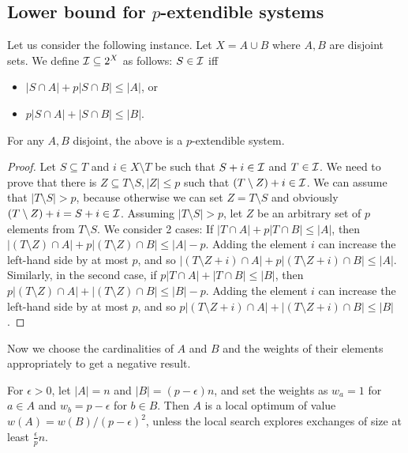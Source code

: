 \subsection{Lower bound for $p$-extendible systems}

Let us consider the following instance. Let $X = A \cup B$ where $A, B$ are disjoint sets. We define $\mathcal{I} \subseteq 2^X$ as follows: $S \in \mathcal{I}$ iff
\begin{itemize}
\item $|S \cap A| + p |S \cap B| \leq |A|$, or
\item $p|S \cap A| + |S \cap B| \leq |B|$.
\end{itemize}

\begin{lemma}
For any $A,B$ disjoint, the above is a $p$-extendible system.
\end{lemma}

\begin{proof}
Let $S \subseteq T$ and $i \in X \setminus T$ be such that $S+i \in \mathcal{I}$ and $T \in \mathcal{I}$. We need to prove that there is $Z \subseteq T \setminus S, |Z| \leq p$ such that $(T \setminus Z) + i \in \mathcal{I}$. We can assume that $|T \setminus S| > p$, because otherwise we can set $Z = T \setminus S$ and obviously $(T \setminus Z) + i = S + i \in \mathcal{I}$.
Assuming $|T \setminus S| > p$, let $Z$ be an arbitrary set of $p$ elements from $T \setminus S$. We consider 2 cases: If $|T \cap A| + p |T \cap B| \leq |A|$, then $|(T \setminus Z) \cap A| + p |(T \setminus Z) \cap B| \leq |A| - p$. Adding the element $i$ can increase the left-hand side by at most $p$, and so $|(T \setminus Z + i) \cap A| + p |(T \setminus Z + i) \cap B| \leq |A|$. Similarly, in the second case, if $p |T \cap A| + |T \cap B| \leq |B|$, then $p |(T \setminus Z) \cap A| + |(T \setminus Z) \cap B| \leq |B| - p$. Adding the element $i$ can increase the left-hand side by at most $p$, and so $p |(T \setminus Z + i) \cap A| + |(T \setminus Z + i) \cap B| \leq |B|$. 
\end{proof}

Now we choose the cardinalities of $A$ and $B$ and the weights of their elements appropriately to get a negative result.

\begin{lemma}
For $\epsilon>0$, let $|A| = n$ and $|B| = (p - \epsilon) n$, and set the weights as $w_a = 1$ for $a \in A$ and $w_b = p - \epsilon$ for $b \in B$.
Then $A$ is a local optimum of value $w(A) = w(B) / (p - \epsilon)^2$, unless the local search explores exchanges of size at least $\frac{\epsilon}{p} n$.
\end{lemma}


